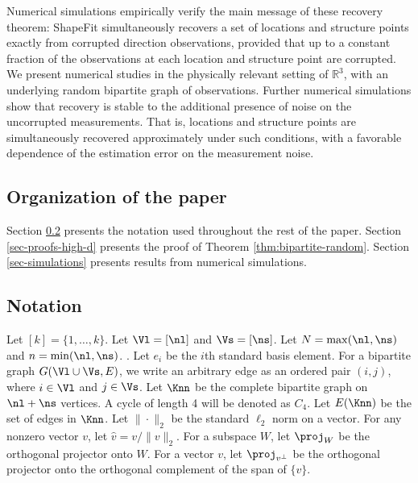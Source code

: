 Numerical simulations empirically verify the main message of these recovery theorem: ShapeFit simultaneously recovers a set of locations and structure points exactly from corrupted direction observations, provided that up to a constant fraction of the observations at each location and structure point are corrupted. We present numerical studies in the physically relevant setting of $\mathbb{R}^3$, with an underlying random \erdosrenyi bipartite graph of observations. Further numerical simulations show that recovery is stable to the additional presence of noise on the uncorrupted measurements.  That is, locations and structure points are simultaneously recovered approximately under such conditions, with a favorable dependence of the estimation error on the measurement noise. 



\subsection{Organization of the paper}
Section \ref{sec-notation} presents the notation used throughout the rest of the paper.   Section \ref{sec-proofs-high-d} presents the proof of Theorem \ref{thm:bipartite-random}.  Section \ref{sec-simulations} presents results from numerical simulations.


\subsection{Notation} \label{sec-notation}
Let $[k] = \{1, \ldots, k\}$.  Let $\Vl = [\nl]$ and $\Vs = [\ns]$.  Let $N = \max(\nl, \ns)$ and $n = \min(\nl, \ns)$. 
. Let $e_i$ be the $i$th standard basis element.  
For a bipartite graph $G(\Vl \cup \Vs, E)$, we write an arbitrary edge as an ordered pair $(i,j)$, where $i \in \Vl$ and $j \in \Vs$.  Let $\Knn$ be the complete bipartite graph on $\nl + \ns$ vertices.  A cycle of length 4 will be denoted as $C_4$.  Let $E(\Knn)$ be the set of edges in $\Knn$. 
Let  $\| \cdot \|_2$ be the standard $\ell_2$ norm on a vector. For any nonzero vector $v$, let $\hat{v} = v / \|v\|_2$.
For a subspace $W$, let $\proj_W$ be the orthogonal projector onto $W$. For a vector $v$, let $\proj_{v^\perp}$ be the orthogonal projector onto the orthogonal complement of the span of $\{v\}$.

